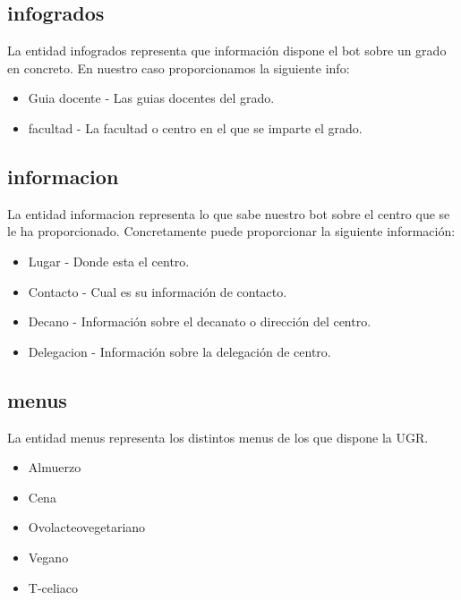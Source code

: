\subsection{infogrados}
La entidad infogrados representa que información dispone el bot sobre un grado en concreto. En nuestro caso proporcionamos la siguiente info:

\begin{itemize}
	\item Guia docente - Las guias docentes del grado.
	\item facultad - La facultad o centro en el que se imparte el grado.
\end{itemize}

\subsection{informacion}
La entidad informacion representa lo que sabe nuestro bot sobre el centro que se le ha proporcionado. Concretamente puede proporcionar la siguiente información:

\begin{itemize}
	\item Lugar - Donde esta el centro.
	\item Contacto - Cual es su información de contacto.
	\item Decano - Información sobre el decanato o dirección del centro.
	\item Delegacion - Información sobre la delegación de centro.
\end{itemize}

\subsection{menus}
La entidad menus representa los distintos menus de los que dispone la UGR.

\begin{itemize}
	\item Almuerzo
	\item Cena
	\item Ovolacteovegetariano
	\item Vegano
	\item T-celiaco
\end{itemize}
